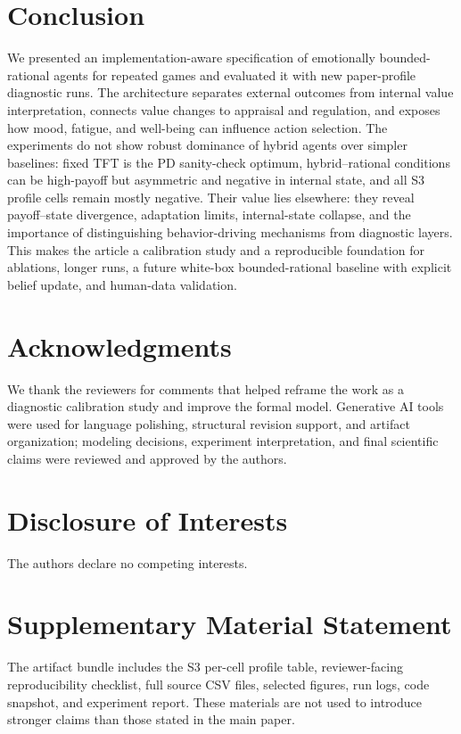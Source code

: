 \documentclass[runningheads]{llncs}
\begin{document}
\section{Conclusion}

We presented an implementation-aware specification of emotionally bounded-rational agents for repeated games and evaluated it with new paper-profile diagnostic runs. The architecture separates external outcomes from internal value interpretation, connects value changes to appraisal and regulation, and exposes how mood, fatigue, and well-being can influence action selection. The experiments do not show robust dominance of hybrid agents over simpler baselines: fixed TFT is the PD sanity-check optimum, hybrid--rational conditions can be high-payoff but asymmetric and negative in internal state, and all S3 profile cells remain mostly negative. Their value lies elsewhere: they reveal payoff--state divergence, adaptation limits, internal-state collapse, and the importance of distinguishing behavior-driving mechanisms from diagnostic layers. This makes the article a calibration study and a reproducible foundation for ablations, longer runs, a future white-box bounded-rational baseline with explicit belief update, and human-data validation.

\section*{Acknowledgments}
We thank the reviewers for comments that helped reframe the work as a diagnostic calibration study and improve the formal model. Generative AI tools were used for language polishing, structural revision support, and artifact organization; modeling decisions, experiment interpretation, and final scientific claims were reviewed and approved by the authors.

\section*{Disclosure of Interests}
The authors declare no competing interests.

\section*{Supplementary Material Statement}
The artifact bundle includes the S3 per-cell profile table, reviewer-facing reproducibility checklist, full source CSV files, selected figures, run logs, code snapshot, and experiment report. These materials are not used to introduce stronger claims than those stated in the main paper.



\end{document}
